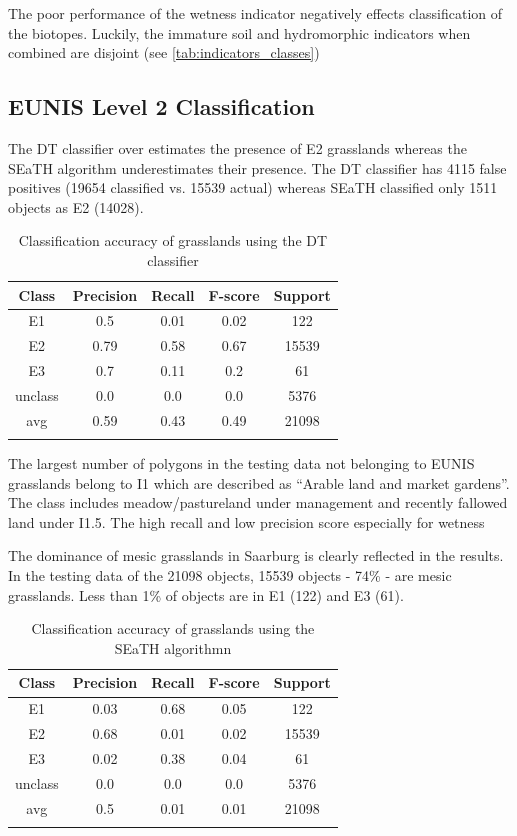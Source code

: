\documentclass[authoryear,preprint,12pt,number]{elsarticle}
\begin{document}
The poor performance of the wetness indicator negatively effects classification of the
biotopes. Luckily, the immature soil and hydromorphic indicators when combined
are disjoint (see \ref{tab:indicators_classes})
\subsection{EUNIS Level 2 Classification}
\label{level2_classification}
The DT classifier over estimates the presence of E2 grasslands whereas the SEaTH
algorithm underestimates their presence. The DT classifier has 4115 false
positives (19654 classified vs. 15539 actual) whereas SEaTH classified only 1511
objects as E2 (14028). %
\begin{table}
\begin{tabular}{c c c c c}
Class & Precision & Recall & F-score & Support\\
\hline
E1 & 0.5 & 0.01 & 0.02 & 122\\
E2 & 0.79 & 0.58 & 0.67 & 15539\\
E3 & 0.7 & 0.11 & 0.2 & 61\\
unclass & 0.0 & 0.0 & 0.0 & 5376\\
avg & 0.59 & 0.43 & 0.49 & 21098\\
\label{fig:dt_lvl2_classification}
\end{tabular}
\caption{Classification accuracy of grasslands using the DT classifier}
\end{table}
The largest number of polygons in the testing data not belonging to EUNIS
grasslands belong to I1 which are described as ``Arable land and
market gardens''. The class includes meadow/pastureland under management and
recently fallowed land under I1.5. The high recall and low precision score
especially for wetness %

The dominance of mesic grasslands in Saarburg is clearly reflected in
the results. In the testing data of the 21098 objects, 15539 objects - 74\% -
are mesic grasslands. Less than 1\% of objects are in E1 (122) and E3 (61). 
\begin{table}
\centering
\begin{tabular}{c c c c c}
Class & Precision & Recall & F-score & Support\\
\hline
E1 & 0.03 & 0.68 & 0.05 & 122\\
E2 & 0.68 & 0.01 & 0.02 & 15539\\
E3 & 0.02 & 0.38 & 0.04 & 61\\
unclass & 0.0 & 0.0 & 0.0 & 5376\\
avg & 0.5 & 0.01 & 0.01 & 21098\\
\label{fig:seath_lvl2_classification}
\end{tabular}
\caption{Classification accuracy of grasslands using the SEaTH algorithmn}
\end{table}
\end{document}
